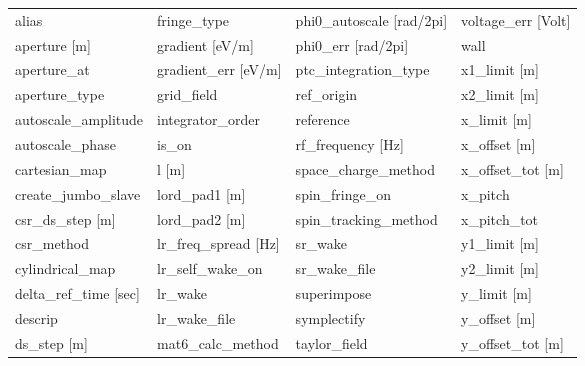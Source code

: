  \begin{tabular}{llll} \toprule
alias                            & fringe_type                      & phi0_autoscale [rad/2pi]         & voltage_err [Volt]               \\
aperture [m]                     & gradient [eV/m]                  & phi0_err [rad/2pi]               & wall                             \\
aperture_at                      & gradient_err [eV/m]              & ptc_integration_type             & x1_limit [m]                     \\
aperture_type                    & grid_field                       & ref_origin                       & x2_limit [m]                     \\
autoscale_amplitude              & integrator_order                 & reference                        & x_limit [m]                      \\
autoscale_phase                  & is_on                            & rf_frequency [Hz]                & x_offset [m]                     \\
cartesian_map                    & l [m]                            & space_charge_method              & x_offset_tot [m]                 \\
create_jumbo_slave               & lord_pad1 [m]                    & spin_fringe_on                   & x_pitch                          \\
csr_ds_step [m]                  & lord_pad2 [m]                    & spin_tracking_method             & x_pitch_tot                      \\
csr_method                       & lr_freq_spread [Hz]              & sr_wake                          & y1_limit [m]                     \\
cylindrical_map                  & lr_self_wake_on                  & sr_wake_file                     & y2_limit [m]                     \\
delta_ref_time [sec]             & lr_wake                          & superimpose                      & y_limit [m]                      \\
descrip                          & lr_wake_file                     & symplectify                      & y_offset [m]                     \\
ds_step [m]                      & mat6_calc_method                 & taylor_field                     & y_offset_tot [m]                 \\

\end{tabular}
